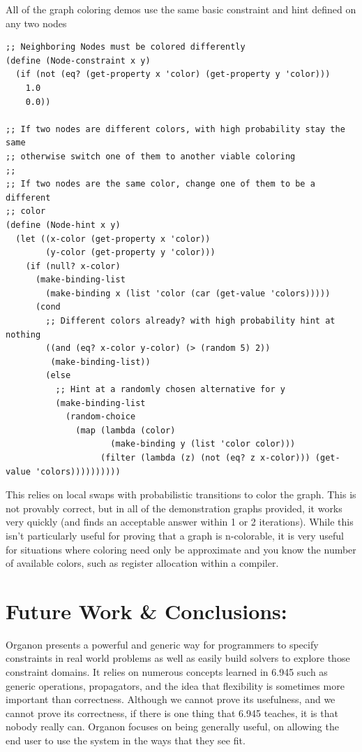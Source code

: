 \documentclass[12pt,a4paper]{article}
\begin{document}
All of the graph coloring demos use the same basic constraint and hint defined on any two nodes
\begin{lstlisting}
;; Neighboring Nodes must be colored differently
(define (Node-constraint x y)
  (if (not (eq? (get-property x 'color) (get-property y 'color)))
    1.0
    0.0))

;; If two nodes are different colors, with high probability stay the same
;; otherwise switch one of them to another viable coloring
;;
;; If two nodes are the same color, change one of them to be a different
;; color
(define (Node-hint x y)
  (let ((x-color (get-property x 'color))
        (y-color (get-property y 'color)))
    (if (null? x-color)
      (make-binding-list
        (make-binding x (list 'color (car (get-value 'colors)))))
      (cond
        ;; Different colors already? with high probability hint at nothing
        ((and (eq? x-color y-color) (> (random 5) 2))
         (make-binding-list))
        (else
          ;; Hint at a randomly chosen alternative for y
          (make-binding-list
            (random-choice
              (map (lambda (color)
                     (make-binding y (list 'color color)))
                   (filter (lambda (z) (not (eq? z x-color))) (get-value 'colors))))))))))
\end{lstlisting}

This relies on local swaps with probabilistic transitions to color the graph.  This is not provably correct, but in all of the demonstration graphs provided, it works very quickly (and finds an acceptable answer within 1 or 2 iterations). While this isn't particularly useful for proving that a graph is n-colorable, it is very useful for situations where coloring need only be approximate and you know the number of available colors, such as register allocation within a compiler.

\section{Future Work \& Conclusions:}
Organon presents a powerful and generic way for programmers to specify constraints in real world problems as well as easily build solvers to explore those constraint domains.  It relies on numerous concepts learned in 6.945 such as generic operations, propagators, and the idea that flexibility is sometimes more important than correctness.  Although we cannot prove its usefulness, and we cannot prove its correctness, if there is one thing that 6.945 teaches, it is that nobody really can.  Organon focuses on being generally useful, on allowing the end user to use the system in the ways that they see fit.
\end{document}
